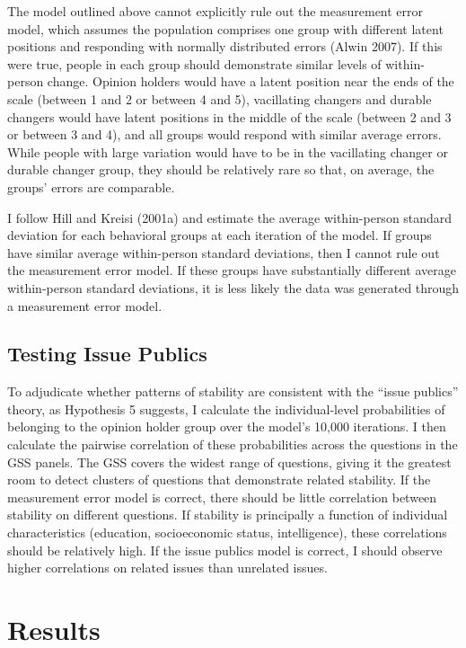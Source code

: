 \documentclass[12pt,]{article}
\begin{document}
The model outlined above cannot explicitly rule out the measurement error model, which assumes the population comprises one group with different latent positions and responding with normally distributed errors (Alwin 2007). If this were true, people in each group should demonstrate similar levels of within-person change. Opinion holders would have a latent position near the ends of the scale (between 1 and 2 or between 4 and 5), vacillating changers and durable changers would have latent positions in the middle of the scale (between 2 and 3 or between 3 and 4), and all groups would respond with similar average errors. While people with large variation would have to be in the vacillating changer or durable changer group, they should be relatively rare so that, on average, the groups' errors are comparable.

I follow Hill and Kreisi (2001a) and estimate the average within-person standard deviation for each behavioral groups at each iteration of the model. If groups have similar average within-person standard deviations, then I cannot rule out the measurement error model. If these groups have substantially different average within-person standard deviations, it is less likely the data was generated through a measurement error model.

\hypertarget{testing-issue-publics}{%
\subsection{Testing Issue Publics}\label{testing-issue-publics}}

To adjudicate whether patterns of stability are consistent with the ``issue publics'' theory, as Hypothesis 5 suggests, I calculate the individual-level probabilities of belonging to the opinion holder group over the model's 10,000 iterations. I then calculate the pairwise correlation of these probabilities across the questions in the GSS panels. The GSS covers the widest range of questions, giving it the greatest room to detect clusters of questions that demonstrate related stability. If the measurement error model is correct, there should be little correlation between stability on different questions. If stability is principally a function of individual characteristics (education, socioeconomic status, intelligence), these correlations should be relatively high. If the issue publics model is correct, I should observe higher correlations on related issues than unrelated issues.

\hypertarget{results}{%
\section{Results}\label{results}}
\end{document}
